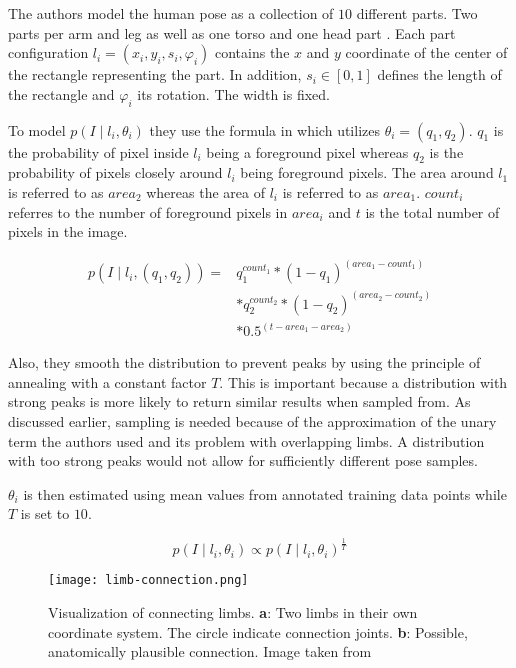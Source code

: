 The authors model the human pose as a collection of $10$ different parts. 
Two parts per arm and leg as well as one torso and one head part .
Each part configuration $l_i = (x_i, y_i, s_i , \varphi_i)$ contains the $x$ and $y$ coordinate of the center of the rectangle representing the part.
In addition, $s_i \in [0,1]$ defines the length of the rectangle and $\varphi_i$ its rotation.
The width is fixed.

To model $p(I \mid l_i, \theta_i)$ they use the formula in  which utilizes $\theta_i = (q_1, q_2)$.
$q_1$ is the probability of pixel inside $l_i$ being a foreground pixel whereas $q_2$ is the probability of pixels closely around $l_i$ being foreground pixels.
The area around $l_1$ is referred to as $area_2$ whereas the area of $l_i$ is referred to as $area_1$.
$count_i$ referres to the number of foreground pixels in $area_i$ and $t$ is the total number of pixels in the image.

\begin{equation}
    \label{eq:felz-unary}
    \begin{split}
        p(I \mid l_i, (q_1, q_2)) = &q_1^{count_1} * (1 - q_1)^{(area_1 - count_1)} \\ 
        &* q_2^{count_2} * (1 - q_2)^{(area_2 - count_2)} \\ 
        &* 0.5^{(t - area_1 - area_2)}
    \end{split}
\end{equation}

Also, they smooth the distribution to prevent peaks by using the principle of annealing with a constant factor $T$.
This is important because a distribution with strong peaks is more likely to return similar results when sampled from.
As discussed earlier, sampling is needed because of the approximation of the unary term the authors used and its problem with overlapping limbs.
A distribution with too strong peaks would not allow for sufficiently different pose samples.

$\theta_i$ is then estimated using mean values from annotated training data points while $T$ is set to $10$.

\begin{equation}
    p(I \mid l_i, \theta_i) \propto p(I \mid l_i, \theta_i)^{\frac{1}{T}}
\end{equation}

\begin{figure}[htb!]
    \centering
    \texttt{[image: limb-connection.png]}
    \caption{Visualization of connecting limbs. \textbf{a}: Two limbs in their own coordinate system. The circle indicate connection joints. \textbf{b}: Possible, anatomically plausible connection. Image taken from \cite{felzenszwalb_pictorial_2005}}
    \label{fig:limb-connection}
\end{figure}

